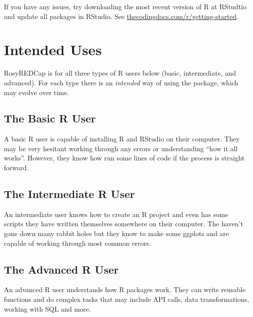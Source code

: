 \documentclass[
]{book}
\begin{document}
If you have any issues, try downloading the most recent version of R at RStudtio and update all packages in RStudio.
See \href{https://www.thecodingdocs.com/r/getting-started}{thecodingdocs.com/r/getting-started}.

\chapter{Intended Uses}\label{intended-uses}

RosyREDCap is for all three types of R users below (basic, intermediate, and advanced). For each type there is an \emph{intended} way of using the package, which may evolve over time.

\section*{The Basic R User}\label{the-basic-r-user}

A basic R user is capable of installing R and RStudio on their computer. They may be very hesitant working through any errors or understanding ``how it all works''. However, they know how run some lines of code if the process is straight forward.

\section*{The Intermediate R User}\label{the-intermediate-r-user}

An intermediate user knows how to create an R project and even has some scripts they have written themselves somewhere on their computer. The haven't gone down many rabbit holes but they know to make some ggplots and are capable of working through most common errors.

\section*{The Advanced R User}\label{the-advanced-r-user}

An advanced R user understands how R packages work. They can write reusable functions and do complex tasks that may include API calls, data transformations, working with SQL and more.

  
\end{document}
